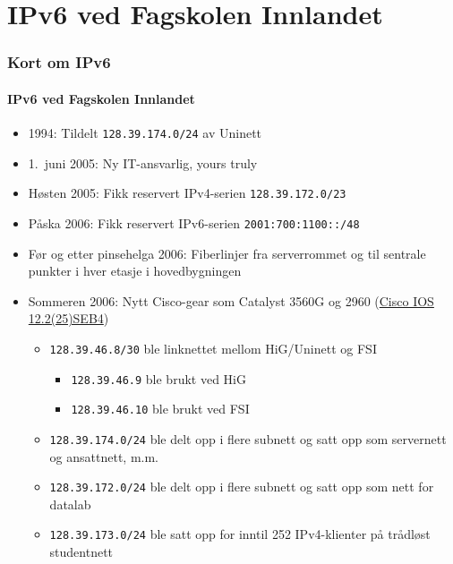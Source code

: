 \section{IPv6 ved Fagskolen Innlandet}
\begin{frame}%
  \frametitle{Kort om IPv6}
  \framesubtitle{IPv6 ved Fagskolen Innlandet}
  \pause
  \begin{itemize}[<+->]
  \item 1994: Tildelt \texttt{128.39.174.0/24} av Uninett
  \item 1.~juni 2005: Ny IT-ansvarlig, yours truly
  \item Høsten 2005: Fikk reservert IPv4-serien
    \texttt{128.39.172.0/23}
  \item Påska 2006: Fikk reservert IPv6-serien
    \texttt{2001:700:1100::/48}
  \item Før og etter pinsehelga 2006: Fiberlinjer fra serverrommet og
    til sentrale punkter i hver etasje i hovedbygningen
  \item Sommeren 2006: Nytt Cisco-gear som Catalyst 3560G og 2960
    (\href{http://www.cisco.com/en/US/docs/switches/lan/catalyst3560/software/release/12.2_25_seb/release/notes/OL7189.html}{Cisco
      IOS 12.2(25)SEB4})
    \begin{itemize}[<+->]
    \item \texttt{128.39.46.8/30} ble linknettet mellom HiG/Uninett og
      FSI
      \begin{itemize}[<+->]
      \item \texttt{128.39.46.9\phantom{0}} ble brukt ved HiG
      \item \texttt{128.39.46.10} ble brukt ved FSI
      \end{itemize}
    \item \texttt{128.39.174.0/24} ble delt opp i flere subnett og
      satt opp som servernett og ansattnett, m.m.
    \item \texttt{128.39.172.0/24} ble delt opp i flere subnett og
      satt opp som nett for datalab
    \item \texttt{128.39.173.0/24} ble satt opp for inntil 252
      IPv4-klienter på trådløst studentnett
    \end{itemize}
  \end{itemize}
\end{frame}

